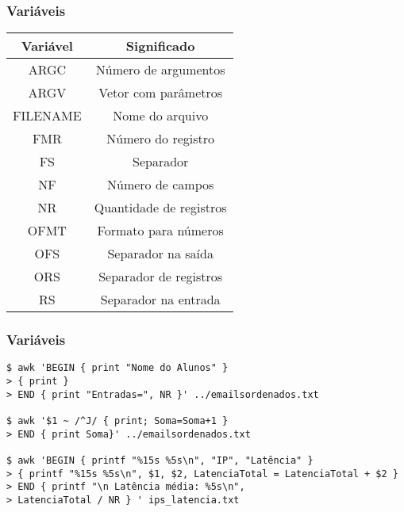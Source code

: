 \documentclass{beamer}
\begin{document}
   \begin{frame}
      \frametitle{Variáveis}
      \begin{table}
         \begin{tabular}{c|c}
         Variável & Significado \\
         \hline 
	 ARGC     &  Número de argumentos\\
	 ARGV     &  Vetor com parâmetros\\
	 FILENAME &  Nome do arquivo\\
	 FMR      &  Número do registro\\
	 FS       &  Separador \\
	 NF       &  Número de campos \\
	 NR       &  Quantidade de registros\\
	 OFMT     &  Formato para números\\
	 OFS      &  Separador na saída\\
	 ORS      &  Separador de registros\\
	 RS       &  Separador na entrada\\ 
         \end{tabular}
      \end{table}
   \end{frame}

   \begin{frame}[fragile]
      \frametitle{Variáveis}
      \footnotesize
      \begin{verbatim}
$ awk 'BEGIN { print "Nome do Alunos" }
> { print }
> END { print "Entradas=", NR }' ../emailsordenados.txt

$ awk '$1 ~ /^J/ { print; Soma=Soma+1 } 
> END { print Soma}' ../emailsordenados.txt

$ awk 'BEGIN { printf "%15s %5s\n", "IP", "Latência" }
> { printf "%15s %5s\n", $1, $2, LatenciaTotal = LatenciaTotal + $2 }
> END { printf "\n Latência média: %5s\n", 
> LatenciaTotal / NR } ' ips_latencia.txt
      \end{verbatim}
\end{frame}
\end{document}
